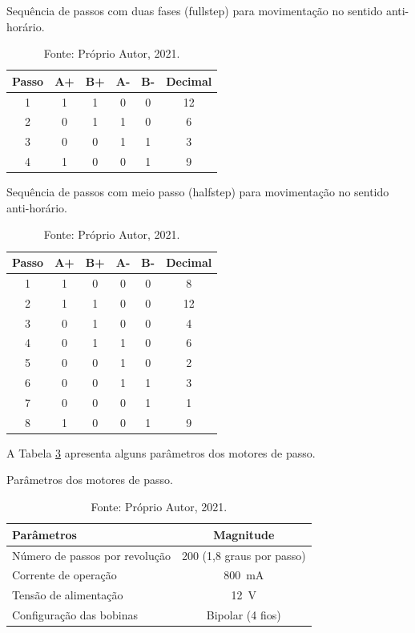 \begin{table}
    \centering
    \caption{Sequência de passos com duas fases (fullstep) para movimentação no sentido anti-horário.}
    \begin{tabular}{cccccc}
        \hline
        \textbf{Passo} & \textbf{A+} & \textbf{B+} & \textbf{A-} & \textbf{B-} & \textbf{Decimal}\\
        \hline
        1 & 1 & 1 & 0 & 0 & 12\\
        2 & 0 & 1 & 1 & 0 & 6\\
        3 & 0 & 0 & 1 & 1 & 3\\
        4 & 1 & 0 & 0 & 1 & 9\\
        \hline       
    \end{tabular}
    \caption*{Fonte: Próprio Autor, 2021.}
    \label{tab:fullstepantihorario}
\end{table}

\begin{table}
    \centering
    \caption{Sequência de passos com meio passo (halfstep) para movimentação no sentido anti-horário.}
    \begin{tabular}{cccccc}
        \hline
        \textbf{Passo} & \textbf{A+} & \textbf{B+} & \textbf{A-} & \textbf{B-} & \textbf{Decimal}\\
        \hline
        1 & 1 & 0 & 0 & 0 & 8\\
        2 & 1 & 1 & 0 & 0 & 12\\
        3 & 0 & 1 & 0 & 0 & 4\\
        4 & 0 & 1 & 1 & 0 & 6\\
        5 & 0 & 0 & 1 & 0 & 2\\
        6 & 0 & 0 & 1 & 1 & 3\\
        7 & 0 & 0 & 0 & 1 & 1\\
        8 & 1 & 0 & 0 & 1 & 9\\
        \hline       
    \end{tabular}
    \caption*{Fonte: Próprio Autor, 2021.}
    \label{tab:halfstepantihorario}
\end{table}

A Tabela \ref{tab:pmotordepasso} apresenta alguns parâmetros dos motores de passo.

\begin{table}
    \centering
    \caption{Parâmetros dos motores de passo.}
    \begin{tabular}{lc}
        \hline
        \textbf{Parâmetros} & \textbf{Magnitude}\\
        \hline
        Número de passos por revolução & 200 (1,8 graus por passo)\\
        Corrente de operação & 800~mA\\
        Tensão de alimentação & 12~V\\
        Configuração das bobinas & Bipolar (4 fios)\\
        \hline       
    \end{tabular}
    \caption*{Fonte: Próprio Autor, 2021.}
    \label{tab:pmotordepasso}
\end{table}

